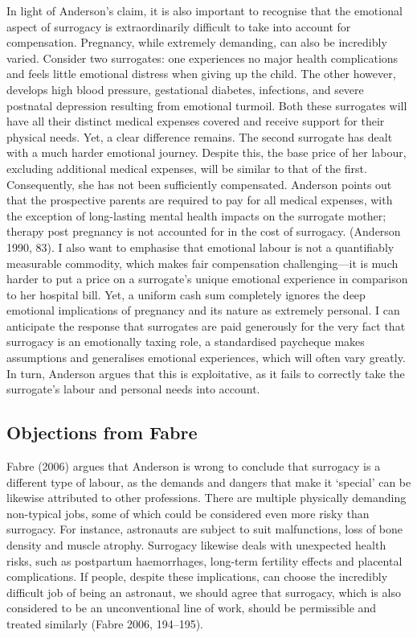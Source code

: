 In light of
Anderson's claim, it is also important to recognise that the emotional
aspect of surrogacy is extraordinarily difficult to take into account
for compensation. Pregnancy, while extremely demanding, can also be
incredibly varied. Consider two surrogates: one experiences no major
health complications and feels little emotional distress when giving up
the child. The other however, develops high blood pressure, gestational
diabetes, infections, and severe postnatal depression resulting from
emotional turmoil. Both these surrogates will have all their distinct
medical expenses covered and receive support for their physical needs.
Yet, a clear difference remains. The second surrogate has dealt with a
much harder emotional journey. Despite this, the base price of her
labour, excluding additional medical expenses, will be similar to that
of the first. Consequently, she has not been sufficiently compensated.
Anderson points out that the prospective parents are required to pay for
all medical expenses, with the exception of long-lasting mental health
impacts on the surrogate mother; therapy post pregnancy is not accounted
for in the cost of surrogacy. (Anderson 1990, 83). I also want to
emphasise that emotional labour is not a quantifiably measurable
commodity, which makes fair compensation challenging---it is much harder
to put a price on a surrogate's unique emotional experience in
comparison to her hospital bill. Yet, a uniform cash sum completely
ignores the deep emotional implications of pregnancy and its nature as
extremely personal. I can anticipate the response that surrogates are
paid generously for the very fact that surrogacy is an emotionally
taxing role, a standardised paycheque makes assumptions and generalises
emotional experiences, which will often vary greatly. In turn, Anderson
argues that this is exploitative, as it fails to correctly take the
surrogate's labour and personal needs into account. 

\subsection{Objections from Fabre}

Fabre (2006) argues that Anderson is wrong to conclude that
surrogacy is a different type of labour, as the demands and dangers that
make it `special' can be likewise attributed to other professions. There
are multiple physically demanding non-typical jobs, some of which could
be considered even more risky than surrogacy. For instance, astronauts
are subject to suit malfunctions, loss of bone density and muscle
atrophy. Surrogacy likewise deals with unexpected health risks, such as
postpartum haemorrhages, long-term fertility effects and placental
complications. If people, despite these implications, can choose the
incredibly difficult job of being an astronaut, we should agree that
surrogacy, which is also considered to be an unconventional line of
work, should be permissible and treated similarly (Fabre 2006, 194--195).

